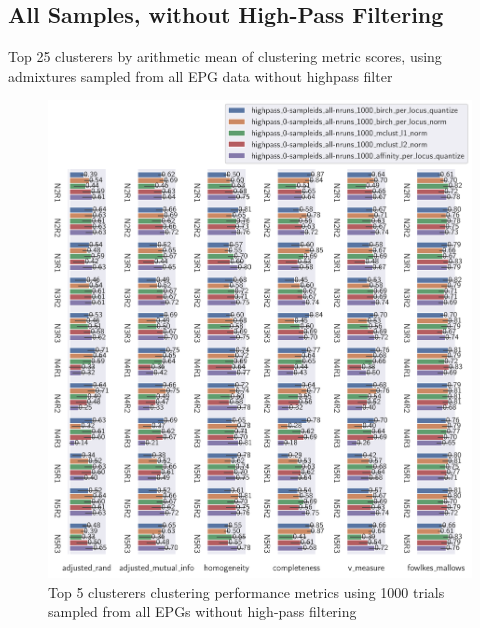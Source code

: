 \begin{theappendices}
\FloatBarrier
\subsection{All Samples, without High-Pass Filtering}

\begin{table}[htbp]
\centering
{}
\caption{Top 25 clusterers by arithmetic mean of clustering metric scores, using admixtures sampled from all EPG data without highpass filter}
\label{appendix:table:top_25_not_ensemble_clusterers_by_metrics_highpass_0-sampleids_all-nruns_1000}
\end{table}

\begin{figure}[htbp]
\centering
\includegraphics[width=\textwidth]{./figures/clust_comparison/highpass_0-sampleids_all-nruns_1000_top_5_clusterers_by_metrics.pdf}
\caption{Top 5 clusterers clustering performance metrics using 1000 trials sampled from all EPGs without high-pass filtering}
\label{appendix:fig:highpass_0-sampleids_all-nruns_1000_top_5_clusterers_by_metrics}
\end{figure}


\end{theappendices}
